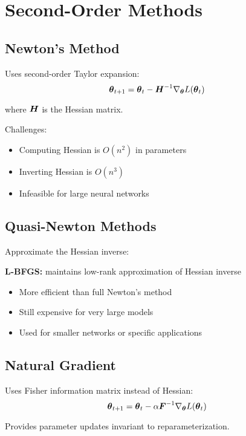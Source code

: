 
\section{Second-Order Methods}
\label{sec:second-order}

\subsection{Newton's Method}

Uses second-order Taylor expansion:
\begin{equation}
\boldsymbol{\theta}_{t+1} = \boldsymbol{\theta}_t - \boldsymbol{H}^{-1} \nabla_{\boldsymbol{\theta}} L(\boldsymbol{\theta}_t)
\end{equation}

where $\boldsymbol{H}$ is the Hessian matrix.

Challenges:
\begin{itemize}
    \item Computing Hessian is $O(n^2)$ in parameters
    \item Inverting Hessian is $O(n^3)$
    \item Infeasible for large neural networks
\end{itemize}

\subsection{Quasi-Newton Methods}

Approximate the Hessian inverse:

\textbf{L-BFGS:} maintains low-rank approximation of Hessian inverse
\begin{itemize}
    \item More efficient than full Newton's method
    \item Still expensive for very large models
    \item Used for smaller networks or specific applications
\end{itemize}

\subsection{Natural Gradient}

Uses Fisher information matrix instead of Hessian:
\begin{equation}
\boldsymbol{\theta}_{t+1} = \boldsymbol{\theta}_t - \alpha \boldsymbol{F}^{-1} \nabla_{\boldsymbol{\theta}} L(\boldsymbol{\theta}_t)
\end{equation}

Provides parameter updates invariant to reparameterization.


